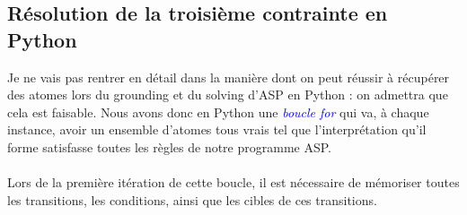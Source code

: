 \documentclass[12pt,a4paper]{article}
\begin{document}
\subsection{Résolution de la troisième contrainte en Python}
Je ne vais pas rentrer en détail dans la manière dont on peut réussir à récupérer des atomes lors du grounding et du solving d'ASP en Python : on admettra que cela est faisable. Nous avons donc en Python une 
\textcolor{blue}{\emph{boucle for}} qui va, à chaque instance, avoir un ensemble d'atomes tous vrais tel que l'interprétation qu'il forme satisfasse toutes les règles de notre programme ASP.\\ \\
Lors de la première itération de cette boucle, il est nécessaire de mémoriser toutes les transitions, les conditions, ainsi que les cibles de ces transitions.\\ \\
\end{document}

